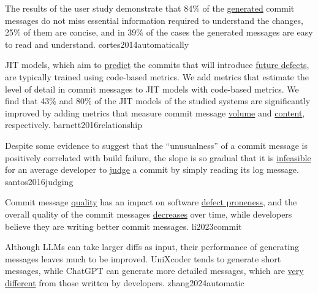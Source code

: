 \documentclass{article}
\begin{document}
  {The results of the user study demonstrate that 84\% of the \ul{generated} commit messages do not miss essential information required to understand the changes, 25\% of them are concise, and in 39\% of the cases the generated messages are easy to read and understand.}
  {cortes2014automatically}

  {JIT models, which aim to \ul{predict} the commits that will introduce \ul{future defects}, are typically trained using code-based metrics. We add metrics that estimate the level of detail in commit messages to JIT models with code-based metrics. We find that 43\% and 80\% of the JIT models of the studied systems are significantly improved by adding metrics that measure commit message \ul{volume} and \ul{content}, respectively.}
  {barnett2016relationship}

  {Despite some evidence to suggest that the ``unusualness'' of a commit message is positively correlated with build failure, the slope is so gradual that it is \ul{infeasible} for an average developer to \ul{judge} a commit by simply reading its log message.}
  {santos2016judging}

  {Commit message \ul{quality} has an impact on software \ul{defect proneness}, and the overall quality of the commit messages \ul{decreases} over time, while developers believe they are writing better commit messages.}
  {li2023commit}

  {Although LLMs can take larger diffs as input, their performance of generating messages leaves much to be improved. UniXcoder tends to generate short messages, while ChatGPT can generate more detailed messages, which are \ul{very different} from those written by developers.}
  {zhang2024automatic}

\end{document}
